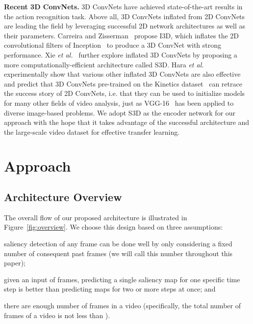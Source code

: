 \documentclass[10pt,twocolumn,letterpaper]{article}
\begin{document}
\textbf{Recent 3D ConvNets.} 3D ConvNets have achieved state-of-the-art results in the action recognition task. Above all, 3D ConvNets inflated from 2D ConvNets are leading the field by leveraging successful 2D network architectures as well as their parameters. Carreira and Zisserman~\cite{carreira2017quo} propose I3D, which inflates the 2D convolutional filters of Inception~\cite{szegedy2015going} to produce a 3D ConvNet with strong performance. Xie \textit{et al.}~\cite{xie2018rethinking} further explore inflated 3D ConvNets by proposing a more computationally-efficient architecture called S3D. Hara \textit{et al.}~\cite{hara2018can} experimentally show that various other inflated 3D ConvNets are also effective and predict that 3D ConvNets pre-trained on the Kinetics dataset~\cite{kay2017kinetics} can retrace the success story of 2D ConvNets, i.e. that they can be used to initialize models for many other fields of video analysis, just as VGG-16~\cite{simonyan2014very} has been applied to diverse image-based problems. We adopt S3D as the encoder network for our approach with the hope that it takes advantage of the successful architecture and the large-scale video dataset for effective transfer learning. 
\section{Approach} \label{sec:approach}

\subsection{Architecture Overview} \label{subsec:overview}

The overall flow of our proposed architecture is illustrated in Figure~\ref{fig:overview}. We choose this design based on three assumptions:
\begin{inlinelist}
  \item saliency detection of any frame can be done well by only considering a fixed number of consequent past frames (we will call this number  throughout this paper);
  \item given an input of  frames, predicting a single saliency map for one specific time step is better than predicting maps for two or more steps at once; and
  \item there are enough number of frames in a video (specifically, the total number of frames of a video is not less than ).
\end{inlinelist}
\end{document}
